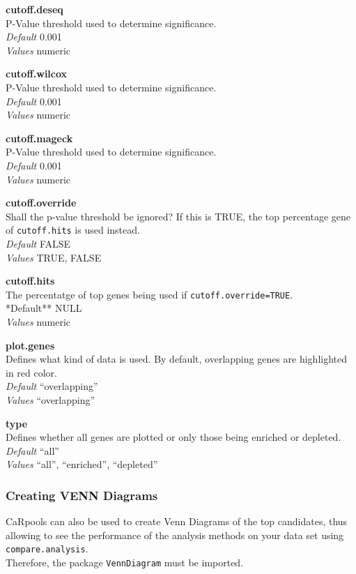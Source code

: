 \documentclass[]{article}
\begin{document}
\textbf{cutoff.deseq}\\
P-Value threshold used to determine significance.\\
\emph{Default} 0.001\\
\emph{Values} numeric

\textbf{cutoff.wilcox}\\
P-Value threshold used to determine significance.\\
\emph{Default} 0.001\\
\emph{Values} numeric

\textbf{cutoff.mageck}\\
P-Value threshold used to determine significance.\\
\emph{Default} 0.001\\
\emph{Values} numeric

\textbf{cutoff.override}\\
Shall the p-value threshold be ignored? If this is TRUE, the top
percentage gene of \texttt{cutoff.hits} is used instead.\\
\emph{Default} FALSE\\
\emph{Values} TRUE, FALSE

\textbf{cutoff.hits}\\
The percentatge of top genes being used if
\texttt{cutoff.override=TRUE}.\\
*Default** NULL\\
\emph{Values} numeric

\textbf{plot.genes}\\
Defines what kind of data is used. By default, overlapping genes are
highlighted in red color.\\
\emph{Default} ``overlapping''\\
\emph{Values} ``overlapping''

\textbf{type}\\
Defines whether all genes are plotted or only those being enriched or
depleted.\\
\emph{Default} ``all''\\
\emph{Values} ``all'', ``enriched'', ``depleted''

\subsubsection{Creating VENN Diagrams}\label{creating-venn-diagrams}

CaRpools can also be used to create Venn Diagrams of the top candidates,
thus allowing to see the performance of the analysis methods on your
data set using \texttt{compare.analysis}.\\
Therefore, the package \texttt{VennDiagram} must be imported.
\end{document}

